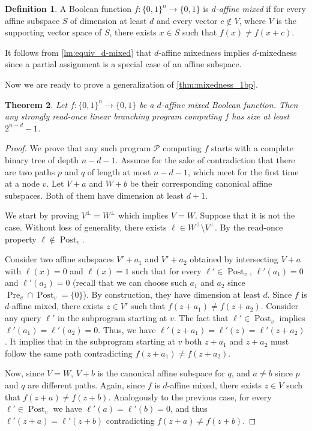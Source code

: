 \documentclass[a4paper,11pt,draft]{article}
\newtheorem{theorem}{Theorem}
\theoremstyle{definition}
\newtheorem{definition}[theorem]{Definition}
\theoremstyle{remark}
\DeclareMathOperator{\pre}{Pre}
\DeclareMathOperator{\post}{Post}
\newcommand{\orth}[1]{{#1}^{\perp}}
\newcommand{\Q}{{\{0,1\}}}
\newcommand{\calP}{\mathcal{P}}
\newcommand{\sreadonce}{strongly read-once}
\newcommand{\readonce}{read-once}
\begin{document}
\begin{definition}
  A Boolean function $f\colon \Q^n \to \Q$ is \emph{$d$-affine mixed} if for every affine subspace $S$ of dimension at least $d$ and every vector $c \not\in V$, where $V$ is the supporting vector space of $S$, there exists $x \in S$ such that $f(x) \neq f(x+c)$.
\end{definition}

It follows from \cref{lm:equiv_d-mixed} that $d$-affine mixedness implies $d$-mixedness since a partial assignment is a special case of an affine subspace.

Now we are ready to prove a generalization of \cref{thm:mixedness_1bp}.

\begin{theorem}
  Let $f\colon \Q^n \to \Q$ be a $d$-affine mixed Boolean function. Then any \sreadonce{} linear branching program computing $f$ has size at least $2^{n-d}-1$.
\end{theorem}
\begin{proof}
  We prove that any such program $\calP$ computing $f$ starts with a complete binary tree of depth $n-d-1$. Assume for the sake of contradiction that there are two paths $p$ and $q$ of length at most $n-d-1$, which meet for the first time at a node $v$. Let $V+a$ and $W+b$ be their corresponding canonical affine subspaces. Both of them have dimension at least $d+1$.

  We start by proving $\orth{V} = \orth{W}$ which implies $V = W$. Suppose that it is not the case. Without loss of generality, there exists $\ell \in \orth{W} \setminus \orth{V}$. By the \readonce{} property $\ell \not\in \post_v$.

  Consider two affine subspaces $V'+a_1$ and $V'+a_2$ obtained by intersecting $V+a$ with $\ell(x) = 0$ and $\ell(x)=1$ such that for every $\ell' \in \post_v$, $\ell'(a_1) = 0$ and $\ell'(a_2) = 0$ (recall that we can choose such $a_1$ and $a_2$ since $\pre_v \cap \post_v = \{0\}$). By construction, they have dimension at least $d$.
  Since $f$ is $d$-affine mixed, there exists $z \in V'$ such that $f(z+a_1) \neq f(z+a_2)$.
  Consider any query $\ell'$ in the subprogram starting at $v$. The fact that $\ell' \in \post_v$ implies $\ell'(a_1) = \ell'(a_2) = 0$. Thus, we have $\ell'(z+a_1) = \ell'(z) = \ell'(z+a_2)$. It implies that in the subprogram starting at $v$ both $z+a_1$ and $z+a_2$ must follow the same path contradicting $f(z+a_1) \neq f(z+a_2)$.

  Now, since $V = W$, $V+b$ is the canonical affine subspace for $q$, and $a \ne b$ since $p$ and $q$ are different paths.
  Again, since $f$ is $d$-affine mixed, there exists $z \in V$ such that $f(z+a) \neq f(z+b)$. Analogously to the previous case, for every $\ell' \in \post_v$ we have $\ell'(a)=\ell'(b)=0$, and thus $\ell'(z+a) = \ell'(z+b)$ contradicting $f(z+a) \neq f(z+b)$.
\end{proof}
\end{document}
